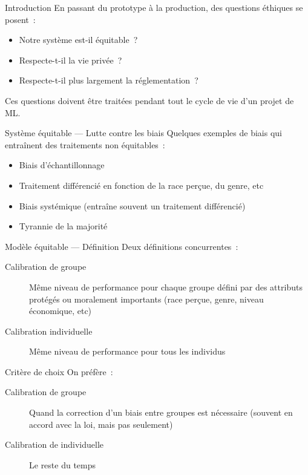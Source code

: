 \begin{frame}{Introduction}
  En passant du prototype à la production, des questions éthiques se posent~:

  \begin{itemize}
    \item Notre système est-il équitable~?
    \item Respecte-t-il la vie privée~?
    \item Respecte-t-il plus largement la réglementation~?
  \end{itemize}

  Ces questions doivent être traitées pendant tout le cycle de vie d'un projet de ML.
\end{frame}

\begin{frame}{Système équitable — Lutte contre les biais}
  Quelques exemples de biais qui entraînent des traitements non équitables~:

  \begin{itemize}
    \item Biais d'échantillonnage
    \item Traitement différencié en fonction de la race perçue, du genre, etc
    \item Biais systémique (entraîne souvent un traitement différencié)
    \item Tyrannie de la majorité
  \end{itemize}
\end{frame}

\begin{frame}{Modèle équitable — Définition}
  Deux définitions concurrentes~:

  \begin{description}
    \item[Calibration de groupe] Même niveau de performance pour chaque groupe défini par des attributs protégés ou moralement importants (race perçue, genre, niveau économique, etc)
    \item[Calibration individuelle] Même niveau de performance pour tous les individus
  \end{description}
\end{frame}

\begin{frame}{Critère de choix}
  On préfère~:

  \begin{description}
    \item[Calibration de groupe] Quand la correction d'un biais entre groupes est nécessaire (souvent en accord avec la loi, mais pas seulement)
    \item[Calibration de individuelle] Le reste du temps
  \end{description}
\end{frame}

